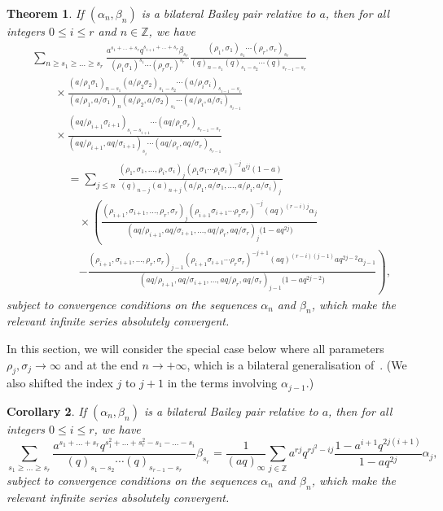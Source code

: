 \documentclass[pdftex]{sigma}
\numberwithin{equation}{section}
\newtheorem{Theorem}{Theorem}[section]
\newtheorem{Corollary}[Theorem]{Corollary}
\newcommand{\field}[1]{\mathbb{#1}}
\newcommand{\Z}{\field{Z}}
\begin{document}
\begin{Theorem}\label{thm:bilatncsqbaileylattice}
If $(\alpha_n, \beta_n)$ is a bilateral Bailey pair relative to $a$, then for all integers $0\leq i\leq r$ and $n\in \Z$, we have
\begin{gather*}%
\sum_{n\geq s_1\geq\dots\geq s_{r}}\frac{a^{s_1+\dots+s_r}q^{s_{i+1}+\dots+s_{r}}\beta_{s_r}}{(\rho_1\sigma_1)^{s_1}\cdots(\rho_r\sigma_r)^{s_r}}\frac{(\rho_1,\sigma_1)_{s_1} \cdots(\rho_r,\sigma_r)_{s_r}}{(q)_{n-s_1}(q)_{s_1-s_2}\cdots(q)_{s_{r-1}-s_r}}\\
\qquad{}\times\frac{(a/\rho_1\sigma_1)_{n-s_1}(a/\rho_2\sigma_2)_{s_1-s_2}\cdots(a/\rho_i\sigma_i)_{s_{i-1}-s_i}}{(a/\rho_1,a/\sigma_1)_{n} (a/\rho_2,a/\sigma_2)_{s_1}\cdots(a/\rho_i,a/\sigma_i)_{s_{i-1}}}\\
\qquad{}\times\frac{(aq/\rho_{i+1}\sigma_{i+1})_{s_i-s_{i+1}}\cdots(aq/\rho_r\sigma_r)_{s_{r-1}-s_r}}{(aq/\rho_{i+1},aq/\sigma_{i+1})_{s_i} \cdots(aq/\rho_r,aq/\sigma_r)_{s_{r-1}}}\\
\phantom{\qquad{}\times}{}=\sum_{j\leq n}
\frac{(\rho_1,\sigma_1,\dots,\rho_i,\sigma_i)_j(\rho_1\sigma_1\cdots\rho_i\sigma_i)^{-j}a^{ij}(1-a)}{(q)_{n-j}(a)_{n+j} (a/\rho_1,a/\sigma_1,\dots,a/\rho_i,a/\sigma_i)_j}\\
\phantom{\qquad{}\times=}{}\times\left(\frac{(\rho_{i+1},\sigma_{i+1},\dots,\rho_r,\sigma_r)_j(\rho_{i+1} \sigma_{i+1}\cdots\rho_r\sigma_r)^{-j}(aq)^{(r-i)j}\alpha_j}{(aq/\rho_{i+1},aq/\sigma_{i+1},\dots,aq/\rho_r,aq/\sigma_r)_j\bigl(1-aq^{2j}\bigr)}\right.\\
\phantom{\qquad{}\times=}{}\left.- \frac{(\rho_{i+1},\sigma_{i+1},\dots,\rho_r,\sigma_r)_{j-1}(\rho_{i+1}\sigma_{i+1}\cdots\rho_r\sigma_r)^{-j+1}(aq)^{(r-i)(j-1)}aq^{2j-2} \alpha_{j-1}}{(aq/\rho_{i+1},aq/\sigma_{i+1},\dots,aq/\rho_r,aq/\sigma_r)_{j-1}\bigl(1-aq^{2j-2}\bigr)}\right),
\end{gather*}
subject to convergence conditions on the sequences $\alpha_n$ and $\beta_n$, which make the relevant infinite series absolutely convergent.
\end{Theorem}

In this section, we will consider the special case below where all parameters $\rho_j,\sigma_j\to\infty$ and at the end $n\to+\infty$, which is a bilateral generalisation of~\cite[Corollary 4.2]{AAB}. (We also shifted the index $j$ to $j+1$ in the terms involving $\alpha_{j-1}$.)

\begin{Corollary}\label{coro:bilatbaileylattice}
If $(\alpha_n, \beta_n)$ is a bilateral Bailey pair relative to $a$, then for all integers $0\leq i\leq r$, we have
\begin{equation}\label{corobilatlattice}
\sum_{s_1\geq\dots\geq s_{r}}\frac{a^{s_1+\dots+s_r}q^{s_1^2+\dots+s_{r}^2-s_1-\dots-s_{i}}}{(q)_{s_1-s_2}\cdots(q)_{s_{r-1}-s_r}}\beta_{s_r} =\frac{1}{(aq)_\infty}\sum_{j\in\mathbb{Z}}a^{rj}q^{rj^2-ij}\frac{1-a^{i+1}q^{2j(i+1)}}{1-aq^{2j}}\alpha_j,
\end{equation}
subject to convergence conditions on the sequences $\alpha_n$ and $\beta_n$, which make the relevant infinite series absolutely convergent.
\end{Corollary}
\end{document}
